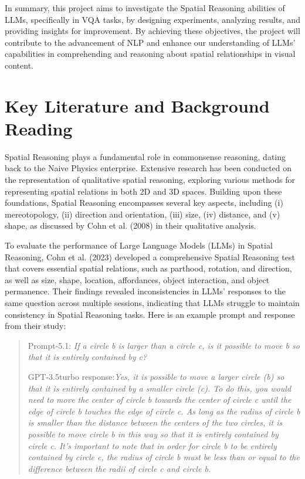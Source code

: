 \documentclass[journal,10pt]{IEEEtran}
\begin{document}
In summary, this project aims to investigate the Spatial Reasoning abilities of LLMs, specifically in VQA tasks, by designing experiments, analyzing results, and providing insights for improvement. By achieving these objectives, the project will contribute to the advancement of NLP and enhance our understanding of LLMs' capabilities in comprehending and reasoning about spatial relationships in visual content.

\section{Key Literature and Background Reading}

Spatial Reasoning plays a fundamental role in commonsense reasoning, dating back to the Naive Physics enterprise\cite{Hobbs1985-HOBFTO}. Extensive research has been conducted on the representation of qualitative spatial reasoning\cite{chen2015survey}, exploring various methods for representing spatial relations in both 2D and 3D spaces. Building upon these foundations, Spatial Reasoning encompasses several key aspects, including (i) mereotopology, (ii) direction and orientation, (iii) size, (iv) distance, and (v) shape, as discussed by Cohn et al. (2008) in their qualitative analysis\cite{cohn2008qualitative}.

To evaluate the performance of Large Language Models (LLMs) in Spatial Reasoning, Cohn et al. (2023) developed a comprehensive Spatial Reasoning test that covers essential spatial relations, such as parthood, rotation, and direction, as well as size, shape, location, affordances, object interaction, and object permanence\cite{cohn2023dialectical}. Their findings revealed inconsistencies in LLMs' responses to the same question across multiple sessions, indicating that LLMs struggle to maintain consistency in Spatial Reasoning tasks. Here is an example prompt and response from their study:
\begin{quote}
    Prompt-5.1: \emph{If a circle b is larger than a circle c, is it possible to move b so that it is entirely contained by c?}

    GPT-3.5turbo response:\emph{Yes, it is possible to move a larger circle (b) so that it is entirely contained by a smaller circle (c). To do this, you would need to move the 
    center of circle b towards the center of circle c until the edge of circle b touches the edge of circle c. As long as the radius of circle b is smaller than the distance between the centers of the two circles, it is possible to move circle b in this way so that it is entirely contained by circle c. It’s important to note that in order for circle b to be entirely contained by circle c, the radius of circle b must be less than or equal to the 
    difference between the radii of circle c and circle b.}
\end{quote}
\end{document}
